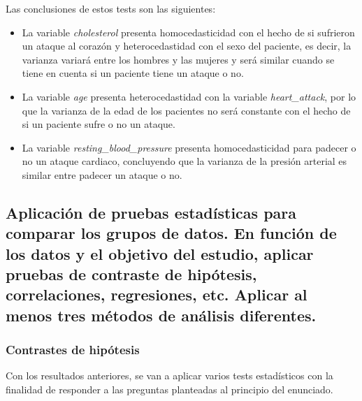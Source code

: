 \documentclass[
]{article}
\begin{document}
Las conclusiones de estos tests son las siguientes:

\begin{itemize}
\item
  La variable \emph{cholesterol} presenta homocedasticidad con el hecho
  de si sufrieron un ataque al corazón y heterocedastidad con el sexo
  del paciente, es decir, la varianza variará entre los hombres y las
  mujeres y será similar cuando se tiene en cuenta si un paciente tiene
  un ataque o no.
\item
  La variable \emph{age} presenta heterocedastidad con la variable
  \emph{heart\_attack}, por lo que la varianza de la edad de los
  pacientes no será constante con el hecho de si un paciente sufre o no
  un ataque.
\item
  La variable \emph{resting\_blood\_pressure} presenta homocedasticidad
  para padecer o no un ataque cardiaco, concluyendo que la varianza de
  la presión arterial es similar entre padecer un ataque o no.
\end{itemize}

\hypertarget{aplicaciuxf3n-de-pruebas-estaduxedsticas-para-comparar-los-grupos-de-datos.-en-funciuxf3n-de-los-datos-y-el-objetivo-del-estudio-aplicar-pruebas-de-contraste-de-hipuxf3tesis-correlaciones-regresiones-etc.-aplicar-al-menos-tres-muxe9todos-de-anuxe1lisis-diferentes.}{%
\subsection{Aplicación de pruebas estadísticas para comparar los grupos
de datos. En función de los datos y el objetivo del estudio, aplicar
pruebas de contraste de hipótesis, correlaciones, regresiones, etc.
Aplicar al menos tres métodos de análisis
diferentes.}\label{aplicaciuxf3n-de-pruebas-estaduxedsticas-para-comparar-los-grupos-de-datos.-en-funciuxf3n-de-los-datos-y-el-objetivo-del-estudio-aplicar-pruebas-de-contraste-de-hipuxf3tesis-correlaciones-regresiones-etc.-aplicar-al-menos-tres-muxe9todos-de-anuxe1lisis-diferentes.}}

\hypertarget{contrastes-de-hipuxf3tesis}{%
\subsubsection{Contrastes de
hipótesis}\label{contrastes-de-hipuxf3tesis}}

Con los resultados anteriores, se van a aplicar varios tests
estadísticos con la finalidad de responder a las preguntas planteadas al
principio del enunciado.
\end{document}
